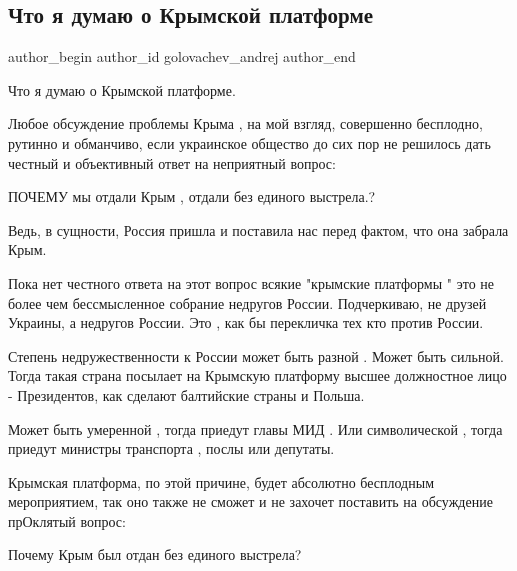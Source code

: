 
 
 
 
 
 
\subsection{Что я думаю о Крымской платформе}
\label{sec:19_08_2021.fb.golovachev_andrej.1.krym_platforma}
 
\ifcmt
 author_begin
   author_id golovachev_andrej
 author_end
\fi

Что я думаю о Крымской платформе.

Любое обсуждение проблемы Крыма , на мой взгляд, совершенно бесплодно, рутинно
и обманчиво,   если   украинское общество  до сих  пор не решилось   дать
честный и объективный  ответ на неприятный вопрос:

ПОЧЕМУ мы отдали Крым , отдали без единого выстрела.?  

Ведь,  в  сущности, Россия пришла и поставила нас перед фактом, что она забрала
Крым.  

Пока нет честного ответа на этот вопрос всякие "крымские платформы " это не
более чем  бессмысленное  собрание недругов России.  Подчеркиваю, не друзей
Украины, а недругов России.  Это , как бы перекличка тех кто против России. 

Степень  недружественности к России может быть разной . Может быть сильной.
Тогда такая страна посылает на Крымскую платформу высшее должностное лицо -
Президентов, как  сделают балтийские страны и Польша. 

Может быть умеренной , тогда приедут главы МИД . Или символической , тогда
приедут министры транспорта , послы или депутаты.

Крымская платформа, по этой причине, будет абсолютно бесплодным мероприятием,
так оно  также не сможет и не захочет  поставить  на обсуждение  прОклятый
вопрос:

Почему Крым был отдан без единого выстрела?  

